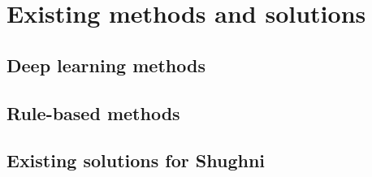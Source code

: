 \section{Existing methods and solutions}

\subsection{Deep learning methods}
\subsection{Rule-based methods}
\subsection{Existing solutions for Shughni}